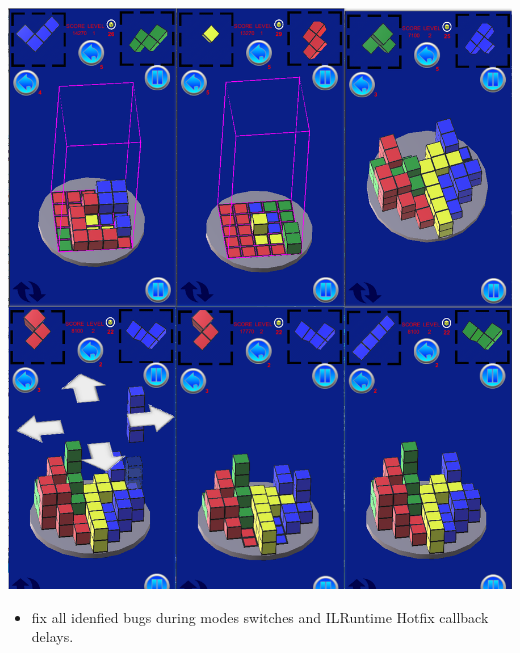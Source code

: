 \documentclass[9pt, b5paper]{article}
\begin{document}
\includegraphics[width=.9\linewidth]{./pic/readme_20221119_113227.png}
\begin{itemize}
\item fix all idenfied bugs during modes switches and ILRuntime Hotfix callback delays.
\end{itemize}
\end{document}
